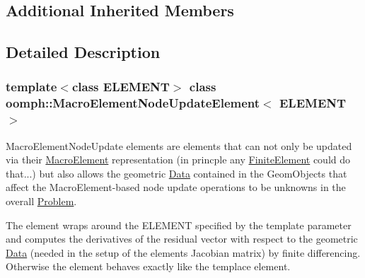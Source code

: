 \subsection*{Additional Inherited Members}


\subsection{Detailed Description}
\subsubsection*{template$<$class E\+L\+E\+M\+E\+NT$>$\newline
class oomph\+::\+Macro\+Element\+Node\+Update\+Element$<$ E\+L\+E\+M\+E\+N\+T $>$}

Macro\+Element\+Node\+Update elements are elements that can not only be updated via their \hyperlink{classoomph_1_1MacroElement}{Macro\+Element} representation (in princple any \hyperlink{classoomph_1_1FiniteElement}{Finite\+Element} could do that...) but also allows the geometric \hyperlink{classoomph_1_1Data}{Data} contained in the Geom\+Objects that affect the Macro\+Element-\/based node update operations to be unknowns in the overall \hyperlink{classoomph_1_1Problem}{Problem}.

The element wraps around the E\+L\+E\+M\+E\+NT specified by the template parameter and computes the derivatives of the residual vector with respect to the geometric \hyperlink{classoomph_1_1Data}{Data} (needed in the setup of the element\textquotesingle{}s Jacobian matrix) by finite differencing. Otherwise the element behaves exactly like the templace element. 

